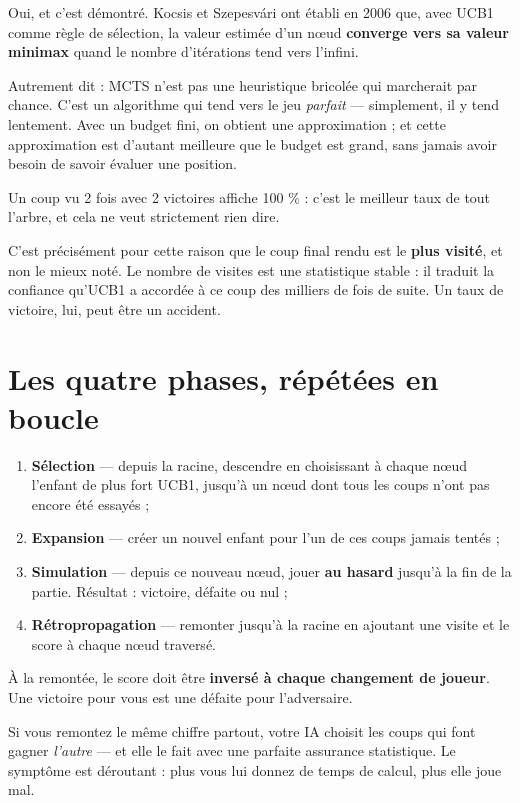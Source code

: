 Oui, et c'est démontré. Kocsis et Szepesvári ont établi en 2006 que, avec
UCB1 comme règle de sélection, la valeur estimée d'un nœud \textbf{converge
vers sa valeur minimax} quand le nombre d'itérations tend vers l'infini.

Autrement dit : MCTS n'est pas une heuristique bricolée qui marcherait par
chance. C'est un algorithme qui tend vers le jeu \emph{parfait} — simplement, il
y tend lentement. Avec un budget fini, on obtient une approximation ; et cette
approximation est d'autant meilleure que le budget est grand, sans jamais avoir
besoin de savoir évaluer une position.

\begin{nkpiege}
Un coup vu 2 fois avec 2 victoires affiche 100 \% : c'est le meilleur taux de
tout l'arbre, et cela ne veut strictement rien dire.

C'est précisément pour cette raison que le coup final rendu est le \textbf{plus
visité}, et non le mieux noté. Le nombre de visites est une statistique stable :
il traduit la confiance qu'UCB1 a accordée à ce coup des milliers de fois de
suite. Un taux de victoire, lui, peut être un accident.
\end{nkpiege}

\section{Les quatre phases, répétées en boucle}

\begin{enumerate}
  \item \textbf{Sélection} — depuis la racine, descendre en choisissant à
        chaque nœud l'enfant de plus fort UCB1, jusqu'à un nœud dont tous les
        coups n'ont pas encore été essayés ;
  \item \textbf{Expansion} — créer un nouvel enfant pour l'un de ces coups
        jamais tentés ;
  \item \textbf{Simulation} — depuis ce nouveau nœud, jouer \textbf{au hasard}
        jusqu'à la fin de la partie. Résultat : victoire, défaite ou nul ;
  \item \textbf{Rétropropagation} — remonter jusqu'à la racine en ajoutant une
        visite et le score à chaque nœud traversé.
\end{enumerate}

\begin{nkpiege}
À la remontée, le score doit être \textbf{inversé à chaque changement de
joueur}. Une victoire pour vous est une défaite pour l'adversaire.

Si vous remontez le même chiffre partout, votre IA choisit les coups qui font
gagner \emph{l'autre} — et elle le fait avec une parfaite assurance
statistique. Le symptôme est déroutant : plus vous lui donnez de temps de
calcul, plus elle joue mal.
\end{nkpiege}

